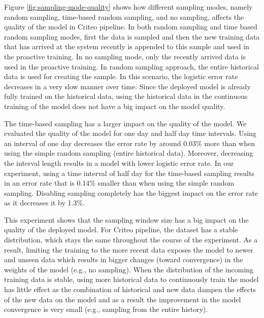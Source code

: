 Figure \ref{fig:sampling-mode-quality} shows how different sampling modes, namely random sampling, time-based random sampling, and no sampling, affects the quality of the model in Criteo pipeline.
In both random sampling and time based random sampling modes, first the data is sampled and then the new training data that has arrived at the system recently is appended to this sample and used in the proactive training.
In no sampling mode, only the recently arrived data is used in the proactive training.
In random sampling approach, the entire historical data is used for creating the sample.
In this scenario, the logistic error rate decreases in a very slow manner over time.
Since the deployed model is already fully trained on the historical data, using the historical data in the continuous training of the model does not have a big impact on the model quality.

The time-based sampling has a larger impact on the quality of the model.
We evaluated the quality of the model for one day and half day time intervals.
Using an interval of one day decreases the error rate by around 0.03\% more than when using the simple random sampling (entire historical data).
Moreover, decreasing the interval length results in a model with lower logistic error rate.
In our experiment, using a time interval of half day for the time-based sampling results in an error rate that is 0.14\% smaller than when using the simple random sampling. 
Disabling sampling completely has the biggest impact on the error rate as it decreases it by 1.3\%.

This experiment shows that the sampling window size has a big impact on the quality of the deployed model.
For Criteo pipeline, the dataset has a stable distribution, which stays the same throughout the course of the experiment.
As a result, limiting the training to the more recent data exposes the model to newer and unseen data which results in bigger changes (toward convergence) in the weights of the model (e.g., no sampling).
When the distribution of the incoming training data is stable, using more historical data to continuously train the model has little effect as the combination of historical and new data dampen the effects of the new data on the model and as a result the improvement in the model convergence is very small (e.g., sampling from the entire history).


